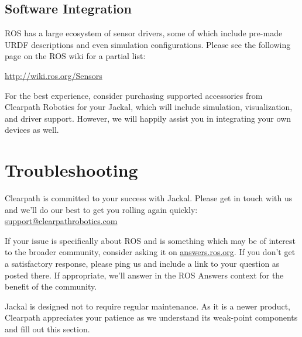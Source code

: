 \documentclass[]{clearpath-manual}
\begin{document}
\subsection{Software Integration}

ROS has a large ecosystem of sensor drivers, some of which include pre-made URDF descriptions and
even simulation configurations. Please see the following page on the ROS wiki for a partial list:

\url{http://wiki.ros.org/Sensors}

For the best experience, consider purchasing supported accessories from Clearpath Robotics for your
Jackal, which will include simulation, visualization, and driver support. However, we will happily
assist you in integrating your own devices as well.


\section{Troubleshooting}\label{trouble}

Clearpath is committed to your success with Jackal. Please get in touch with us and we'll
do our best to get you rolling again quickly: \href{mailto:support@clearpathrobotics.com}{support@clearpathrobotics.com}

If your issue is specifically about ROS and is something which may be of interest
to the broader community, consider asking it on \href{http://answers.ros.org}{answers.ros.org}.
If you don't get a satisfactory response, please ping us and include a link to your question
as posted there. If appropriate, we'll answer in the ROS Answers context for the benefit of the
community.

Jackal is designed not to require regular maintenance. As it is a newer product, Clearpath
appreciates your patience as we understand its weak-point components and fill out this section.
\end{document}
